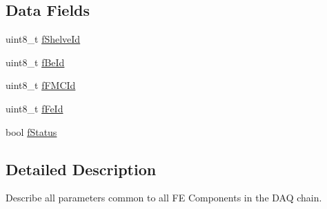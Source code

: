 \subsection*{Data Fields}
\begin{DoxyCompactItemize}
\item 
uint8\-\_\-t \hyperlink{class_ph2___hw_description_1_1_f_e_description_a8a20ee1f2114b9a6da4483f5e0f8c625}{f\-Shelve\-Id}
\item 
uint8\-\_\-t \hyperlink{class_ph2___hw_description_1_1_f_e_description_ab279589109fe8a83ecd7cd6c631394b3}{f\-Be\-Id}
\item 
uint8\-\_\-t \hyperlink{class_ph2___hw_description_1_1_f_e_description_a7740e5ec6ae04ee47ac3081ff57e1946}{f\-F\-M\-C\-Id}
\item 
uint8\-\_\-t \hyperlink{class_ph2___hw_description_1_1_f_e_description_a3a1a3a8323484b1bfc1a4ab3d7a59a31}{f\-Fe\-Id}
\item 
bool \hyperlink{class_ph2___hw_description_1_1_f_e_description_a646f651eb15f15a519006eca502e3418}{f\-Status}
\end{DoxyCompactItemize}


\subsection{Detailed Description}
Describe all parameters common to all F\-E Components in the D\-A\-Q chain. 

